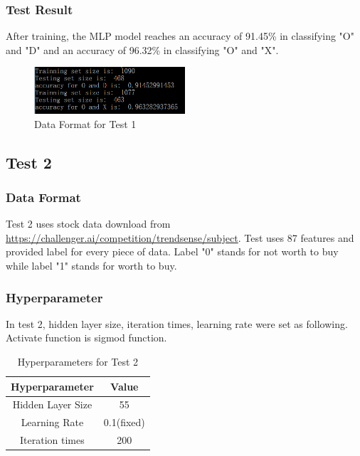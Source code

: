 \documentclass[a4paper]{article}
\begin{document}
\subsubsection{Test Result}
After training, the MLP model reaches an accuracy of 91.45\% in classifying "O" and "D" and an accuracy of 96.32\% in classifying "O" and "X".
\begin{figure}[H]
\centering
\includegraphics[width=0.5\textwidth]{res1.png}
\caption{\label{fig:frog}Data Format for Test 1}
\end{figure}
\subsection{Test 2}
\subsubsection{Data Format}
Test 2 uses stock data download from \url{https://challenger.ai/competition/trendsense/subject}. Test uses 87 features and provided label for every piece of data. Label "0" stands for not worth to buy while label "1" stands for worth to buy.
\subsubsection{Hyperparameter}
In test 2, hidden layer size, iteration times, learning rate were set as following. Activate function is sigmod function.
\begin{table}[H]
\centering
\begin{tabular}{|c|c|}
 \hline
Hyperparameter& Value \\
 \hline
Hidden Layer Size & 55   \\
 \hline
Learning Rate& 0.1(fixed)\\
  \hline
Iteration times & 200\\
\hline
\end{tabular}\\
\caption{\label{tab:widgets}Hyperparameters for Test 2}
\end{table}
\end{document}
